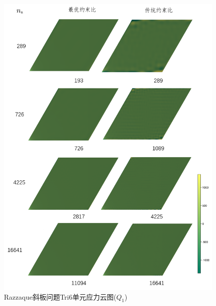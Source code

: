 \begin{figure}[!h]
    \centering 
        \includegraphics[scale=0.6]{figures/shearlocking/skewplateQ1_tri6.png}
        \caption{Razzaque斜板问题Tri6单元应力云图($Q_1$)}\label{ch_5:fig:skewplateQ1_tri6}
\end{figure}
